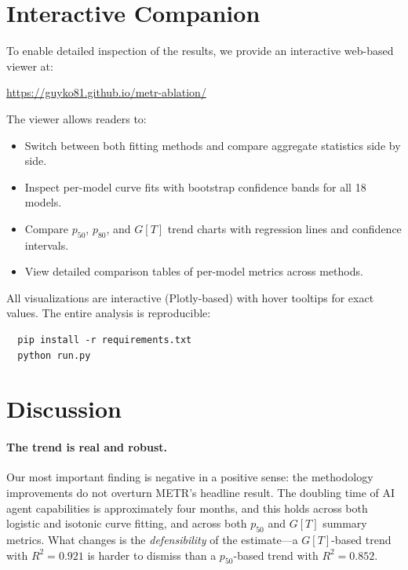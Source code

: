 \documentclass[11pt,a4paper]{article}
\begin{document}
\section{Interactive Companion}
\label{sec:interactive}

To enable detailed inspection of the results, we provide an interactive web-based viewer at:
\begin{center}
  \url{https://guyko81.github.io/metr-ablation/}
\end{center}
The viewer allows readers to:
\begin{itemize}
  \item Switch between both fitting methods and compare aggregate statistics side by side.
  \item Inspect per-model curve fits with bootstrap confidence bands for all 18 models.
  \item Compare $p_{50}$, $p_{80}$, and $G[T]$ trend charts with regression lines and confidence intervals.
  \item View detailed comparison tables of per-model metrics across methods.
\end{itemize}
All visualizations are interactive (Plotly-based) with hover tooltips for exact values.
The entire analysis is reproducible:
\begin{verbatim}
  pip install -r requirements.txt
  python run.py
\end{verbatim}


\section{Discussion}
\label{sec:discussion}

\paragraph{The trend is real and robust.}
Our most important finding is negative in a positive sense: the methodology improvements do not overturn METR's headline result.
The doubling time of AI agent capabilities is approximately four months, and this holds across both logistic and isotonic curve fitting, and across both $p_{50}$ and $G[T]$ summary metrics.
What changes is the \emph{defensibility} of the estimate---a $G[T]$-based trend with $R^2 = 0.921$ is harder to dismiss than a $p_{50}$-based trend with $R^2 = 0.852$.
\end{document}
